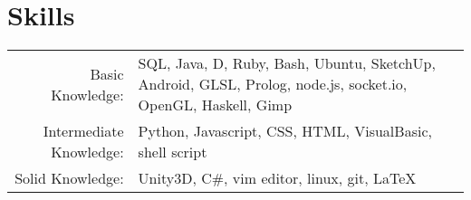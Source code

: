 \section{Skills}
\begin{tabular}{r p{12cm}<{\hfill}}
	Basic Knowledge:	&	SQL, Java, D, Ruby, Bash, Ubuntu, SketchUp, Android, 
  GLSL, Prolog, node.js, socket.io, OpenGL, Haskell, Gimp\\
	Intermediate Knowledge: &	Python, Javascript, CSS, HTML,
  VisualBasic, shell script \\
	Solid Knowledge: & Unity3D, C\#, vim editor, linux, git, \LaTeX \\
\end{tabular}
